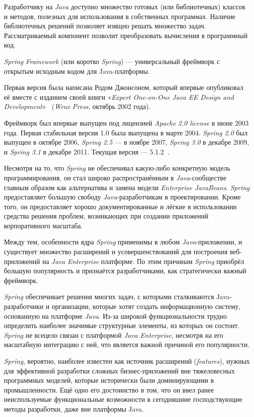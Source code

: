 Разработчику на \textit{Java} доступно множество готовых (или библиотечных) классов и методов, полезных для использования в собственных программах. Наличие библиотечных решений позволяет изящно решать множество задач. Рассматриваемый компонент позволит преобразовать вычисления в программный код.

\textit{Spring Framework} (или коротко \textit{Spring}) — универсальный фреймворк с открытым исходным кодом для Java-платформы. 

Первая версия была написана Родом Джонсоном, который впервые опубликовал её вместе с изданием своей книги «\textit{Expert One-on-One Java EE Design and Development}»~\cite{spring} (\textit{Wrox Press}, октябрь 2002 года).

Фреймворк был впервые выпущен под лицензией \textit{Apache 2.0 license} в июне 2003 года. Первая стабильная версия 1.0 была выпущена в марте 2004. \textit{Spring 2.0} был выпущен в октябре 2006, \textit{Spring 2.5} — в ноябре 2007, \textit{Spring 3.0} в декабре 2009, и \textit{Spring 3.1} в декабре 2011. Текущая версия — 5.1.2~\cite{spring}.

Несмотря на то, что \textit{Spring} не обеспечивал какую-либо конкретную модель программирования, он стал широко распространённым в \textit{Java}-сообществе главным образом как альтернатива и замена модели \textit{Enterprise JavaBeans}. \textit{Spring} предоставляет большую свободу \textit{Java}-разработчикам в проектировании. Кроме того, он предоставляет хорошо документированные и лёгкие в использовании средства решения проблем, возникающих при создании приложений корпоративного масштаба.

Между тем, особенности ядра \textit{Spring} применимы в любом \textit{Java}-приложении, и существует множество расширений и усовершенствований для построения веб-приложений на \textit{Java Enterprise} платформе. По этим причинам \textit{Spring} приобрёл большую популярность и признаётся разработчиками, как стратегически важный фреймворк.

\textit{Spring} обеспечивает решения многих задач, с которыми сталкиваются Java-разработчики и организации, которые хотят создать информационную систему, основанную на платформе \textit{Java}. Из-за широкой функциональности трудно определить наиболее значимые структурные элементы, из которых он состоит. \textit{Spring} не всецело связан с платформой \textit{Java Enterprise}, несмотря на его масштабную интеграцию с ней, что является важной причиной его популярности.

\textit{Spring}, вероятно, наиболее известен как источник расширений (\textit{features}), нужных для эффективной разработки сложных бизнес-приложений вне тяжеловесных программных моделей, которые исторически были доминирующими в промышленности. Ещё одно его достоинство в том, что он ввел ранее неиспользуемые функциональные возможности в сегодняшние господствующие методы разработки, даже вне платформы Java.

